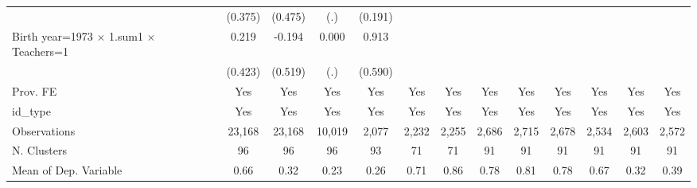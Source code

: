 {\begin{tabular}{l*{12}{c}}
                    &     (0.375)   &     (0.475)   &         (.)   &     (0.191)   &               &               &               &               &               &               &               &               \\
Birth year=1973 $\times$ 1.sum1 $\times$ Teachers=1&       0.219   &      -0.194   &       0.000   &       0.913   &               &               &               &               &               &               &               &               \\
                    &     (0.423)   &     (0.519)   &         (.)   &     (0.590)   &               &               &               &               &               &               &               &               \\
Prov. FE            &         Yes   &         Yes   &         Yes   &         Yes   &         Yes   &         Yes   &         Yes   &         Yes   &         Yes   &         Yes   &         Yes   &         Yes   \\
id\_type             &         Yes   &         Yes   &         Yes   &         Yes   &         Yes   &         Yes   &         Yes   &         Yes   &         Yes   &         Yes   &         Yes   &         Yes   \\
\hline
Observations        &      23,168   &      23,168   &      10,019   &       2,077   &       2,232   &       2,255   &       2,686   &       2,715   &       2,678   &       2,534   &       2,603   &       2,572   \\
N. Clusters         &          96   &          96   &          96   &          93   &          71   &          71   &          91   &          91   &          91   &          91   &          91   &          91   \\
Mean of Dep. Variable&        0.66   &        0.32   &        0.23   &        0.26   &        0.71   &        0.86   &        0.78   &        0.81   &        0.78   &        0.67   &        0.32   &        0.39   \\
\hline\hline
\end{tabular}
}
